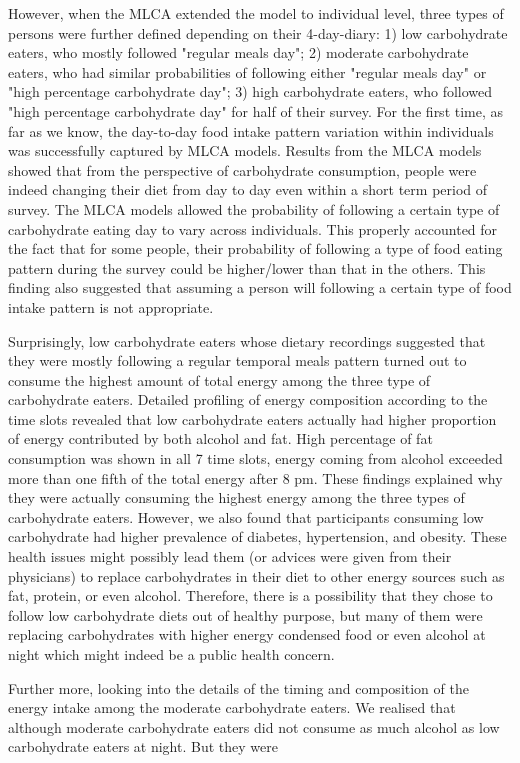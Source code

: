 However, when the MLCA extended the model to individual level, three types of persons were further defined depending on their 4-day-diary: 1) low carbohydrate eaters, who mostly followed "regular meals day"; 2) moderate carbohydrate eaters, who had similar probabilities of following either "regular meals day" or "high percentage carbohydrate day"; 3) high carbohydrate eaters, who followed "high percentage carbohydrate day" for half of their survey. For the first time, as far as we know, the day-to-day food intake pattern variation within individuals was successfully captured by MLCA models. Results from the MLCA models showed that from the perspective of carbohydrate consumption, people were indeed changing their diet from day to day even within a short term period of survey. The MLCA models allowed the probability of following a certain type of carbohydrate eating day to vary across individuals. This properly accounted for the fact that for some people, their probability of following a type of food eating pattern during the survey could be higher/lower than that in the others. This finding also suggested that assuming a person will following a certain type of food intake pattern is not appropriate.

Surprisingly, low carbohydrate eaters whose dietary recordings suggested that they were mostly following a regular temporal meals pattern turned out to consume the highest amount of total energy among the three type of carbohydrate eaters. Detailed profiling of energy composition according to the time slots revealed that low carbohydrate eaters actually had higher proportion of energy contributed by both alcohol and fat. High percentage of fat consumption was shown in all 7 time slots, energy coming from alcohol exceeded more than one fifth of the total energy after 8 pm. These findings explained why they were actually consuming the highest energy among the three types of carbohydrate eaters. However, we also found that participants consuming low carbohydrate had higher prevalence of diabetes, hypertension, and obesity. These health issues might possibly lead them (or advices were given from their physicians) to replace carbohydrates in their diet to other energy sources such as fat, protein, or even alcohol. Therefore, there is a possibility that they chose to follow low carbohydrate diets out of healthy purpose, but many of them were replacing carbohydrates with higher energy condensed food or even alcohol at night which might indeed be a public health concern. 

Further more, looking into the details of the timing and composition of the energy intake among the moderate carbohydrate eaters. We realised that although moderate carbohydrate eaters did not consume as much alcohol as low carbohydrate eaters at night. But they were 




